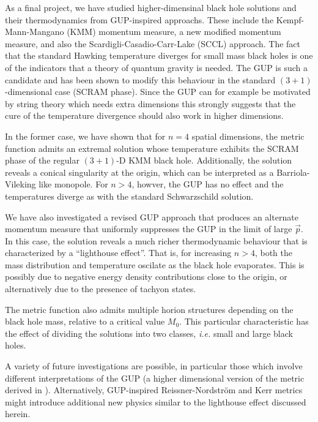\begin{fullwidth}
As a final project, we have studied higher-dimensinal black hole solutions and
their thermodynamics from GUP-inspired approachs. These include the
Kempf-Mann-Mangano (KMM) momentum measure, a new modified momentum measure,
and also the Scardigli-Casadio-Carr-Lake (SCCL) approach. The fact that the
standard Hawking temperature diverges for small mass black holes is one
of the indicators that a theory of quantum gravity is needed. The GUP is
such a candidate and has been shown to modify this behaviour in the
standard $(3+1)$-dimensional case (SCRAM phase).  Since the GUP can
for example be motivated by string theory which needs extra dimensions
this strongly suggests that the cure of the temperature divergence
should also work in higher dimensions.

In the former case, we have shown that for $n=4$ spatial dimensions, the
metric function admits an extremal solution whose temperature exhibits
the SCRAM phase of the regular $(3+1)$-D KMM black hole.  Additionally,
the solution reveals a conical singularity at the origin, which can be
interpreted as a Barriola-Vileking like monopole.  For $n > 4$, howver,
the GUP has no effect and the temperatures diverge as with the
standard Schwarzschild solution.

We have also investigated a revised GUP approach that produces an alternate
momentum measure that uniformly suppresses the GUP in the limit of large
$\vec{p}$.  In this case, the solution reveals a much richer thermodynamic
behaviour that is characterized by a ``lighthouse effect''.  That is, for 
increasing $n > 4$, both the mass distribution and temperature oscilate
as the black hole evaporates. This is possibly due to negative energy
density contributions close to the origin, or alternatively due to the
presence of tachyon states. 

The metric function also admits multiple horion structures depending
on the black hole mass, relative to a critical value $M_0$.  This
particular characteristic has the effect of dividing the solutions
into two classes, {\it i.e.} small and large black holes.

A variety of future investigations are possible, in particular those
which involve different interpretations of the GUP (\eg a higher
dimensional version of the metric derived in \cite{CMN15}).  Alternatively,
GUP-inspired Reissner-Nordstr\"om and Kerr metrics might introduce
additional new physics similar to the lighthouse effect discussed herein.

\end{fullwidth}